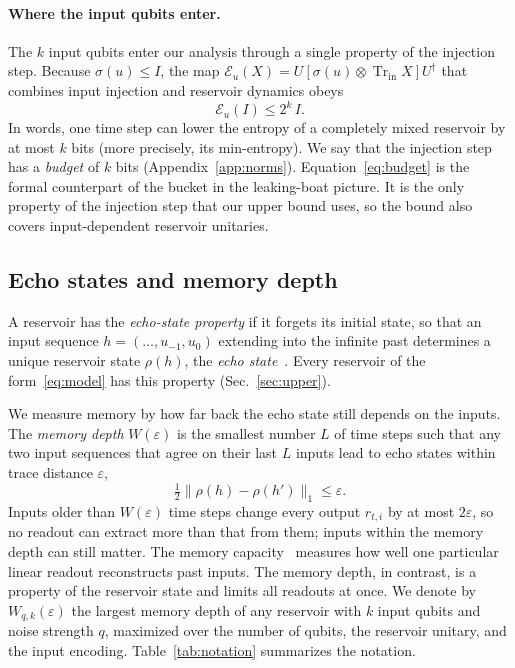 \documentclass[aps,pra,reprint,superscriptaddress,floatfix]{revtex4-2}
\theoremstyle{plain}
\newcommand{\tr}{\operatorname{Tr}}
\newcommand{\Norm}[1]{\lVert #1\rVert}
\newcommand{\cE}{\mathcal E}
\begin{document}
\paragraph*{Where the input qubits enter.}
The $k$ input qubits enter our analysis through a single property of the injection step. Because $\sigma(u)\le I$, the map $\cE_u(X)=U[\sigma(u)\otimes\tr_{\mathrm{in}}X]U^\dagger$ that combines input injection and reservoir dynamics obeys
\begin{equation}
\cE_u(I)\le2^k\,I .
\label{eq:budget}
\end{equation}
In words, one time step can lower the entropy of a completely mixed reservoir by at most $k$ bits (more precisely, its min-entropy). We say that the injection step has a \emph{budget} of $k$ bits (Appendix~\ref{app:norms}). Equation~\eqref{eq:budget} is the formal counterpart of the bucket in the leaking-boat picture. It is the only property of the injection step that our upper bound uses, so the bound also covers input-dependent reservoir unitaries.

\subsection{Echo states and memory depth}

A reservoir has the \emph{echo-state property} if it forgets its initial state, so that an input sequence $h=(\dots,u_{-1},u_0)$ extending into the infinite past determines a unique reservoir state $\rho(h)$, the \emph{echo state}~\cite{Jaeger2001,MartinezPena2023}. Every reservoir of the form~\eqref{eq:model} has this property (Sec.~\ref{sec:upper}).

We measure memory by how far back the echo state still depends on the inputs. The \emph{memory depth} $W(\varepsilon)$ is the smallest number $L$ of time steps such that any two input sequences that agree on their last $L$ inputs lead to echo states within trace distance $\varepsilon$,
\begin{equation}
\tfrac12\Norm{\rho(h)-\rho(h')}_1\le\varepsilon .
\label{eq:depth}
\end{equation}
Inputs older than $W(\varepsilon)$ time steps change every output $r_{t,i}$ by at most $2\varepsilon$, so no readout can extract more than that from them; inputs within the memory depth can still matter. The memory capacity~\cite{Jaeger2002} measures how well one particular linear readout reconstructs past inputs. The memory depth, in contrast, is a property of the reservoir state and limits all readouts at once. We denote by $W_{q,k}(\varepsilon)$ the largest memory depth of any reservoir with $k$ input qubits and noise strength $q$, maximized over the number of qubits, the reservoir unitary, and the input encoding. Table~\ref{tab:notation} summarizes the notation.
\end{document}
